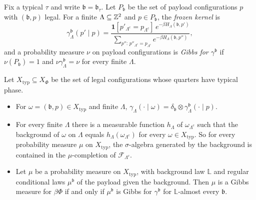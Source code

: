 Fix a typical $\tau$ and write $\mathfrak b=\mathfrak b_\tau$. Let $P_{\mathfrak b}$ be the set of payload configurations $p$ with $(\mathfrak b,p)$ legal. For a finite $\Lambda\subseteq\mathbb{Z}^2$ and $p\in P_{\mathfrak b}$, the \emph{frozen kernel} is
\[
\gamma^{\mathfrak b}_\Lambda(p'\mid p)=\frac{\mathbf 1[p'_{\Lambda^c}=p_{\Lambda^c}]\,e^{-\beta H_\Lambda(\mathfrak b,p')}}{\sum_{p'':\,p''_{\Lambda^c}=p_{\Lambda^c}}e^{-\beta H_\Lambda(\mathfrak b,p'')}},
\]
and a probability measure $\nu$ on payload configurations is \emph{Gibbs for $\gamma^{\mathfrak b}$} if $\nu(P_{\mathfrak b})=1$ and $\nu\gamma^{\mathfrak b}_\Lambda=\nu$ for every finite $\Lambda$.

\begin{lemma}\label{lem:freeze}
Let $X_{\mathrm{typ}}\subseteq X_\Phi$ be the set of legal configurations whose quarters have typical phase.
\begin{itemize}
\item[(a)] For $\omega=(\mathfrak b,p)\in X_{\mathrm{typ}}$ and finite $\Lambda$, $\gamma_\Lambda(\cdot\mid\omega)=\delta_{\mathfrak b}\otimes\gamma^{\mathfrak b}_\Lambda(\cdot\mid p)$.
\item[(b)] For every finite $\Lambda$ there is a measurable function $h_\Lambda$ of $\omega_{\Lambda^c}$ such that the background of $\omega$ on $\Lambda$ equals $h_\Lambda(\omega_{\Lambda^c})$ for every $\omega\in X_{\mathrm{typ}}$. So for every probability measure $\mu$ on $X_{\mathrm{typ}}$, the $\sigma$-algebra generated by the background is contained in the $\mu$-completion of $\mathcal F_{\Lambda^c}$.
\item[(c)] Let $\mu$ be a probability measure on $X_{\mathrm{typ}}$, with background law $\mathbb L$ and regular conditional laws $\mu^{\mathfrak b}$ of the payload given the background. Then $\mu$ is a Gibbs measure for $\beta\Phi$ if and only if $\mu^{\mathfrak b}$ is Gibbs for $\gamma^{\mathfrak b}$ for $\mathbb L$-almost every $\mathfrak b$.
\end{itemize}
\end{lemma}

